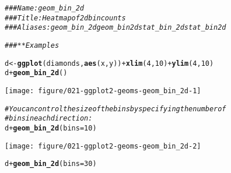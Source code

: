 \documentclass[a4paper,titlepage]{tufte-handout}\usepackage[]{graphicx}\usepackage[]{xcolor}
\makeatletter
\def\maxwidth{ %
  \ifdim\Gin@nat@width>\linewidth
    \linewidth
  \else
    \Gin@nat@width
  \fi
}
\newcommand{\hlnum}[1]{\textcolor[rgb]{0.686,0.059,0.569}{#1}}%
\newcommand{\hlcom}[1]{\textcolor[rgb]{0.678,0.584,0.686}{\textit{#1}}}%
\newcommand{\hlopt}[1]{\textcolor[rgb]{0,0,0}{#1}}%
\newcommand{\hldef}[1]{\textcolor[rgb]{0.345,0.345,0.345}{#1}}%
\newcommand{\hlkwb}[1]{\textcolor[rgb]{0.69,0.353,0.396}{#1}}%
\newcommand{\hlkwc}[1]{\textcolor[rgb]{0.333,0.667,0.333}{#1}}%
\newcommand{\hlkwd}[1]{\textcolor[rgb]{0.737,0.353,0.396}{\textbf{#1}}}%
\newenvironment{kframe}{%
 \def\at@end@of@kframe{}%
 \ifinner\ifhmode%
  \def\at@end@of@kframe{\end{minipage}}%
  \begin{minipage}{\columnwidth}%
 \fi\fi%
 \def\FrameCommand##1{\hskip\@totalleftmargin \hskip-\fboxsep
 \colorbox{shadecolor}{##1}\hskip-\fboxsep
     \hskip-\linewidth \hskip-\@totalleftmargin \hskip\columnwidth}%
 \MakeFramed {\advance\hsize-\width
   \@totalleftmargin\z@ \linewidth\hsize
   \@setminipage}}%
 {\par\unskip\endMakeFramed%
 \at@end@of@kframe}
\newenvironment{knitrout}{}{} %
\makeatother
\begin{document}
\begin{knitrout}
\color{fgcolor}\begin{kframe}
\begin{alltt}
\hlcom{### Name: geom_bin_2d}
\hlcom{### Title: Heatmap of 2d bin counts}
\hlcom{### Aliases: geom_bin_2d geom_bin2d stat_bin_2d stat_bin2d}

\hlcom{### ** Examples}

\hldef{d} \hlkwb{<-} \hlkwd{ggplot}\hldef{(diamonds,} \hlkwd{aes}\hldef{(x, y))} \hlopt{+} \hlkwd{xlim}\hldef{(}\hlnum{4}\hldef{,} \hlnum{10}\hldef{)} \hlopt{+} \hlkwd{ylim}\hldef{(}\hlnum{4}\hldef{,} \hlnum{10}\hldef{)}
\hldef{d} \hlopt{+} \hlkwd{geom_bin_2d}\hldef{()}
\end{alltt}


{\ttfamily\noindent\color{warningcolor}{\#\# Warning: Removed 478 rows containing non-finite outside the scale range\\\#\# (`stat\_bin2d()`).}}

{\ttfamily\noindent\color{warningcolor}{\#\# Warning: Removed 5 rows containing missing values or values outside the scale range\\\#\# (`geom\_tile()`).}}\end{kframe}
\texttt{[image: figure/021-ggplot2-geoms-geom\_bin\_2d-1]} 
\begin{kframe}\begin{alltt}
\hlcom{# You can control the size of the bins by specifying the number of}
\hlcom{# bins in each direction:}
\hldef{d} \hlopt{+} \hlkwd{geom_bin_2d}\hldef{(}\hlkwc{bins} \hldef{=} \hlnum{10}\hldef{)}
\end{alltt}


{\ttfamily\noindent\color{warningcolor}{\#\# Warning: Removed 478 rows containing non-finite outside the scale range\\\#\# (`stat\_bin2d()`).}}

{\ttfamily\noindent\color{warningcolor}{\#\# Warning: Removed 6 rows containing missing values or values outside the scale range\\\#\# (`geom\_tile()`).}}\end{kframe}
\texttt{[image: figure/021-ggplot2-geoms-geom\_bin\_2d-2]} 
\begin{kframe}\begin{alltt}
\hldef{d} \hlopt{+} \hlkwd{geom_bin_2d}\hldef{(}\hlkwc{bins} \hldef{=} \hlnum{30}\hldef{)}
\end{alltt}



\end{kframe}
\end{knitrout}
\end{document}
